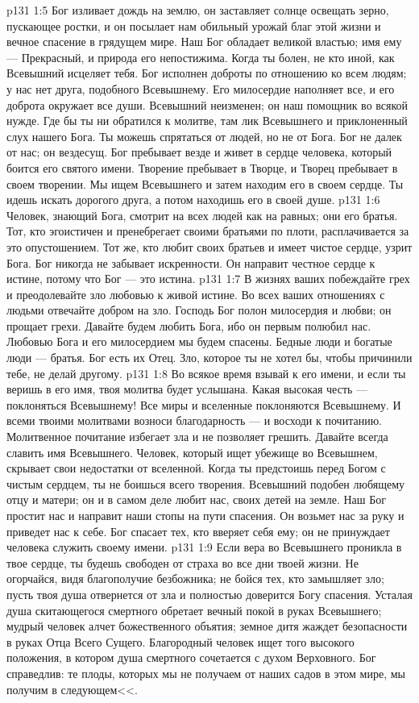 \vs p131 1:5 Бог изливает дождь на землю, он заставляет солнце освещать зерно, пускающее ростки, и он посылает нам обильный урожай благ этой жизни и вечное спасение в грядущем мире. Наш Бог обладает великой властью; имя ему --- Прекрасный, и природа его непостижима. Когда ты болен, не кто иной, как Всевышний исцеляет тебя. Бог исполнен доброты по отношению ко всем людям; у нас нет друга, подобного Всевышнему. Его милосердие наполняет все, и его доброта окружает все души. Всевышний неизменен; он наш помощник во всякой нужде. Где бы ты ни обратился к молитве, там лик Всевышнего и приклоненный слух нашего Бога. Ты можешь спрятаться от людей, но не от Бога. Бог не далек от нас; он вездесущ. Бог пребывает везде и живет в сердце человека, который боится его святого имени. Творение пребывает в Творце, и Творец пребывает в своем творении. Мы ищем Всевышнего и затем находим его в своем сердце. Ты идешь искать дорогого друга, а потом находишь его в своей душе.
\vs p131 1:6 Человек, знающий Бога, смотрит на всех людей как на равных; они его братья. Тот, кто эгоистичен и пренебрегает своими братьями по плоти, расплачивается за это опустошением. Тот же, кто любит своих братьев и имеет чистое сердце, узрит Бога. Бог никогда не забывает искренности. Он направит честное сердце к истине, потому что Бог --- это истина.
\vs p131 1:7 В жизнях ваших побеждайте грех и преодолевайте зло любовью к живой истине. Во всех ваших отношениях с людьми отвечайте добром на зло. Господь Бог полон милосердия и любви; он прощает грехи. Давайте будем любить Бога, ибо он первым полюбил нас. Любовью Бога и его милосердием мы будем спасены. Бедные люди и богатые люди --- братья. Бог есть их Отец. Зло, которое ты не хотел бы, чтобы причинили тебе, не делай другому.
\vs p131 1:8 Во всякое время взывай к его имени, и если ты веришь в его имя, твоя молитва будет услышана. Какая высокая честь --- поклоняться Всевышнему! Все миры и вселенные поклоняются Всевышнему. И всеми твоими молитвами возноси благодарность --- и восходи к почитанию. Молитвенное почитание избегает зла и не позволяет грешить. Давайте всегда славить имя Всевышнего. Человек, который ищет убежище во Всевышнем, скрывает свои недостатки от вселенной. Когда ты предстоишь перед Богом с чистым сердцем, ты не боишься всего творения. Всевышний подобен любящему отцу и матери; он и в самом деле любит нас, своих детей на земле. Наш Бог простит нас и направит наши стопы на пути спасения. Он возьмет нас за руку и приведет нас к себе. Бог спасает тех, кто вверяет себя ему; он не принуждает человека служить своему имени.
\vs p131 1:9 Если вера во Всевышнего проникла в твое сердце, ты будешь свободен от страха во все дни твоей жизни. Не огорчайся, видя благополучие безбожника; не бойся тех, кто замышляет зло; пусть твоя душа отвернется от зла и полностью доверится Богу спасения. Усталая душа скитающегося смертного обретает вечный покой в руках Всевышнего; мудрый человек алчет божественного объятия; земное дитя жаждет безопасности в руках Отца Всего Сущего. Благородный человек ищет того высокого положения, в котором душа смертного сочетается с духом Верховного. Бог справедлив: те плоды, которых мы не получаем от наших садов в этом мире, мы получим в следующем<<.
